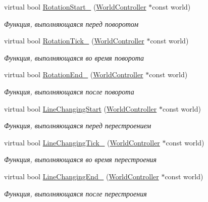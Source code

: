 \begin{Indent}
\begin{DoxyCompactItemize}
virtual bool \hyperlink{classrtm_1_1_vehicle_object_a2c449bdf4d8e954fe7bd06de4b64deb7}{Rotation\+Start\+\_\+} (\hyperlink{classrtm_1_1_world_controller}{World\+Controller} $\ast$const world)
\begin{DoxyCompactList}\small\item\em Функция, выполняющаяся перед поворотом \end{DoxyCompactList}\item 
virtual bool \hyperlink{classrtm_1_1_vehicle_object_a3dd8736f34c5e5ba26259335193628e5}{Rotation\+Tick\+\_\+} (\hyperlink{classrtm_1_1_world_controller}{World\+Controller} $\ast$const world)
\begin{DoxyCompactList}\small\item\em Функция, выполняющаяся во время поворота \end{DoxyCompactList}\item 
virtual bool \hyperlink{classrtm_1_1_vehicle_object_ab109b98ab7bda9402a6197efa98e5a03}{Rotation\+End\+\_\+} (\hyperlink{classrtm_1_1_world_controller}{World\+Controller} $\ast$const world)
\begin{DoxyCompactList}\small\item\em Функция, выполняющаяся после поворота \end{DoxyCompactList}\item 
virtual bool \hyperlink{classrtm_1_1_vehicle_object_a8976be533dfa4704f7b221c79d1fce99}{Line\+Changing\+Start} (\hyperlink{classrtm_1_1_world_controller}{World\+Controller} $\ast$const world)
\begin{DoxyCompactList}\small\item\em Функция, выполняющаяся перед перестроением \end{DoxyCompactList}\item 
virtual bool \hyperlink{classrtm_1_1_vehicle_object_ad14f2e164f2105fbae0c982cec4aff9a}{Line\+Changing\+Tick\+\_\+} (\hyperlink{classrtm_1_1_world_controller}{World\+Controller} $\ast$const world)
\begin{DoxyCompactList}\small\item\em Функция, выполняющаяся во время перестроения \end{DoxyCompactList}\item 
virtual bool \hyperlink{classrtm_1_1_vehicle_object_a61c3ec3ea6a03c4c031c2b72def10c72}{Line\+Changing\+End\+\_\+} (\hyperlink{classrtm_1_1_world_controller}{World\+Controller} $\ast$const world)
\begin{DoxyCompactList}\small\item\em Функция, выполняющаяся после перестроения \end{DoxyCompactList}\end{DoxyCompactItemize}
\end{Indent}
